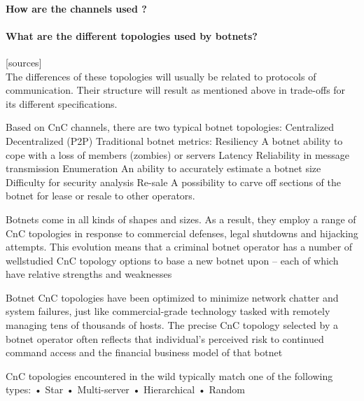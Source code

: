 \paragraph{How are the channels used ?}

\paragraph{What are the different topologies used by botnets?}
[sources]\\
The differences of these topologies will usually be related to protocols of communication. Their structure will result as mentioned above in trade-offs for its different specifications.

Based on CnC channels, there are two typical botnet topologies:
Centralized
Decentralized (P2P)
     Traditional botnet metrics:
Resiliency
A botnet ability to cope with a loss of members (zombies) or servers
Latency
Reliability in message transmission
Enumeration
An ability to accurately estimate a botnet size
Difficulty for security analysis
Re-sale
A possibility to carve off sections of the botnet for lease or resale to
other operators. 

Botnets come in all kinds of shapes and sizes. As a result, they employ a range of CnC
topologies in response to commercial defenses, legal shutdowns and hijacking
attempts. This evolution means that a criminal botnet operator has a number of wellstudied
CnC topology options to base a new botnet upon – each of which have
relative strengths and weaknesses

Botnet CnC topologies have been optimized to minimize network chatter and system
failures, just like commercial-grade technology tasked with remotely managing tens of
thousands of hosts. The precise CnC topology selected by a botnet operator often
reflects that individual’s perceived risk to continued command access and the financial
business model of that botnet

CnC topologies encountered in the wild typically match one of the following types:
• Star
• Multi-server
• Hierarchical
• Random

